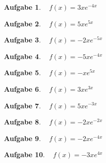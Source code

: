 \documentclass[12pt]{article}
\theoremstyle{note}
\newtheorem{aufgabe}{Aufgabe}
\begin{document}
\begin{flushleft}
\begin{aufgabe} ~  
$f(x)=$$3 x e^{- 4 x}$
\end{aufgabe}\vspace{1em}\begin{aufgabe} ~  
$f(x)=$$5 x e^{5 x}$
\end{aufgabe}\vspace{1em}\begin{aufgabe} ~  
$f(x)=$$- 2 x e^{- 5 x}$
\end{aufgabe}\vspace{1em}\begin{aufgabe} ~  
$f(x)=$$- 5 x e^{- 4 x}$
\end{aufgabe}\vspace{1em}\begin{aufgabe} ~  
$f(x)=$$- x e^{5 x}$
\end{aufgabe}\vspace{1em}\begin{aufgabe} ~  
$f(x)=$$3 x e^{3 x}$
\end{aufgabe}\vspace{1em}\begin{aufgabe} ~  
$f(x)=$$5 x e^{- 3 x}$
\end{aufgabe}\vspace{1em}\begin{aufgabe} ~  
$f(x)=$$- 2 x e^{- 2 x}$
\end{aufgabe}\vspace{1em}\begin{aufgabe} ~  
$f(x)=$$- 2 x e^{- 4 x}$
\end{aufgabe}\vspace{1em}\begin{aufgabe} ~  
$f(x)=$$- 3 x e^{4 x}$
\end{aufgabe}\vspace{1em}
\end{flushleft} 
\end{document}
